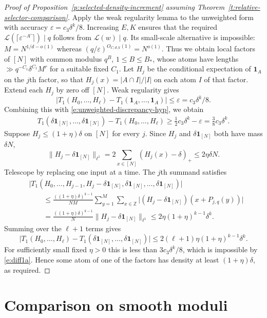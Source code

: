 \documentclass[12pt]{amsart}
\newcommand{\1}{\mathbf 1}
\theoremstyle{definition}
\begin{document}
\begin{proof}[Proof of Proposition~\ref{p:selected-density-increment}
assuming Theorem~\ref{t:relative-selector-comparison}]
Apply the weak regularity lemma \cite[Lemma~5.3]{KMTT} to the
unweighted form with accuracy \(\varepsilon=c_3\delta^k/8\).
Increasing \(E,K\) ensures that the required
\(\mathcal L(\lceil\varepsilon^{-A'}\rceil)\mid q\) follows from
\(\mathcal L(w)\mid q\). Its small-scale alternative is impossible:
\(M=N^{1/d-o(1)}\) whereas \((q/\varepsilon)^{O_{C,d,k}(1)}=N^{o(1)}\).
Thus we obtain local factors of \([N]\) with common modulus \(q^B\),
\(1\le B\le B_*\), whose atoms have lengths
\(\gg q^{-C_1}\delta^{C_1}M^r\) for a suitable fixed \(C_1\).
Let \(H_j\) be the conditional expectation of \(\mathbf 1_A\) on
the \(j\)th factor, so that \(H_j(x)=|A\cap I|/|I|\) on each
atom \(I\) of that factor. Extend each $H_j$ by zero off $[N]$. Weak regularity gives
\[
 \bigl|T_1(H_0,\ldots,H_\ell)
       -T_1(\mathbf 1_A,\ldots,\mathbf 1_A)\bigr|
 \le \varepsilon = c_3\delta^k/8.
\]
Combining this with \eqref{e:unweighted-discrepancy-hyp}, we obtain
\begin{align}\label{e:diff1a}
    T_1(\delta\mathbf 1_{[N]},\ldots,\delta\mathbf 1_{[N]})
 -T_1(H_0,\ldots,H_\ell)
 \ge \tfrac12 c_3\delta^k-\varepsilon
 = \tfrac38 c_3\delta^k.
\end{align}
Suppose $H_j\leq(1+\eta)\delta$ on $[N]$ for every $j$.
Since $H_j$ and $\delta\mathbf1_{[N]}$ both have mass $\delta N$,
\[
 \|H_j-\delta\mathbf1_{[N]}\|_{\ell^1}
 =2\sum_{x\in[N]}(H_j(x)-\delta)_+
 \leq 2\eta\delta N.
\]
Telescope by replacing one input at a time. The $j$th summand
satisfies
\[
\begin{aligned}
 &\bigl|T_1(H_0,\ldots,H_{j-1},H_j-\delta\mathbf 1_{[N]},\delta\mathbf 1_{[N]},\ldots,\delta\mathbf 1_{[N]})\bigr|\\
 &\qquad\le
 \frac{((1+\eta)\delta)^{k-1}}{NM}
 \sum_{y=1}^M\sum_{x\in\mathbb Z}
 \bigl|(H_j-\delta\mathbf 1_{[N]})(x+P_{j,q}(y))\bigr|\\
 &\qquad=
 \frac{((1+\eta)\delta)^{k-1}}{N}\|H_j-\delta\mathbf 1_{[N]}\|_{\ell^1}
 \le 2\eta(1+\eta)^{k-1}\delta^k.
\end{aligned}
\]
Summing over the \(\ell+1\) terms gives
\[
 \bigl|T_1(H_0,\ldots,H_\ell)-T_1(\delta\mathbf 1_{[N]},\ldots,\delta\mathbf 1_{[N]})\bigr|
 \le 2(\ell+1)\eta(1+\eta)^{k-1}\delta^k.
\] 
For sufficiently small fixed
\(\eta>0\) this is less than \(3c_3\delta^k/8\), which is impossible by \eqref{e:diff1a}. Hence some atom of one
of the factors has density at least \((1+\eta)\delta\), as required.
\end{proof}

\section{Comparison on smooth moduli}\label{s:relative}
\end{document}
